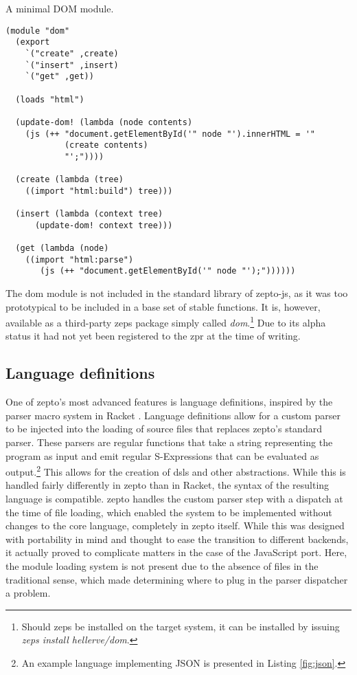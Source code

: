 \documentclass[oneside,11pt,xetex]{scrbook}
\begin{document}
\begin{listing}[H]
\caption{A minimal DOM module.}
\begin{verbatim}
(module "dom"
  (export
    `("create" ,create)
    `("insert" ,insert)
    `("get" ,get))

  (loads "html")

  (update-dom! (lambda (node contents)
    (js (++ "document.getElementById('" node "').innerHTML = '"
            (create contents)
            "';"))))

  (create (lambda (tree)
    ((import "html:build") tree)))

  (insert (lambda (context tree)
      (update-dom! context tree)))

  (get (lambda (node)
    ((import "html:parse")
       (js (++ "document.getElementById('" node "');"))))))
\end{verbatim}
\label{fig:dom}
\end{listing}

The \gls{dom} module is not included in the standard library of zepto-js,
as it was too prototypical to be included in a base set of stable
functions. It is, however, available as a third-party \gls{zeps} package
simply called \textit{dom}.\footnote{Should \gls{zeps} be installed on
the target system, it can be installed by issuing \textit{zeps install
hellerve/dom}.} Due to its alpha status it had not yet been registered
to the \gls{zpr} at the time of writing.

\subsection{Language definitions}
\label{sec:LangDef}

One of zepto's most advanced features is language definitions, inspired by
the parser macro system in Racket \parencite{RPM}. Language definitions allow
for a custom parser to be injected into the loading of source files that replaces
zepto's standard parser. These parsers are regular functions that take a string
representing the program as input and emit regular S-Expressions that can be evaluated
as output.\footnote{An example language implementing JSON is presented in Listing \ref{fig:json}.}
This allows for the creation of \glspl{dsl} and other abstractions.
While this is handled fairly differently in zepto than in Racket, the syntax of the
resulting language is compatible. zepto handles the custom parser step with a dispatch
at the time of file loading, which enabled the system to be implemented without
changes to the core language, completely in zepto itself. While this was
designed with portability in mind and thought to ease the transition to
different backends, it actually proved to complicate matters in the case
of the JavaScript port. Here, the module loading system is not present due
to the absence of files in the traditional sense, which made determining where to
plug in the parser dispatcher a problem.
\end{document}
